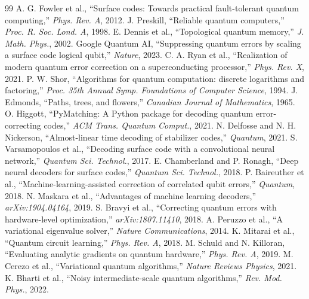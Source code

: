 \documentclass[journal,twocolumn]{IEEEtran}
\begin{document}
\begin{thebibliography}{99}
 A. G. Fowler et al., ``Surface codes: Towards practical fault-tolerant quantum computing,'' \textit{Phys. Rev. A}, 2012.
 J. Preskill, ``Reliable quantum computers,'' \textit{Proc. R. Soc. Lond. A}, 1998.
 E. Dennis et al., ``Topological quantum memory,'' \textit{J. Math. Phys.}, 2002.
 Google Quantum AI, ``Suppressing quantum errors by scaling a surface code logical qubit,'' \textit{Nature}, 2023.
 C. A. Ryan et al., ``Realization of modern quantum error correction on a superconducting processor,'' \textit{Phys. Rev. X}, 2021.
 P. W. Shor, ``Algorithms for quantum computation: discrete logarithms and factoring,'' \textit{Proc. 35th Annual Symp. Foundations of Computer Science}, 1994.
 J. Edmonds, ``Paths, trees, and flowers,'' \textit{Canadian Journal of Mathematics}, 1965.
 O. Higgott, ``PyMatching: A Python package for decoding quantum error-correcting codes,'' \textit{ACM Trans. Quantum Comput.}, 2021.
 N. Delfosse and N. H. Nickerson, ``Almost-linear time decoding of stabilizer codes,'' \textit{Quantum}, 2021.
 S. Varsamopoulos et al., ``Decoding surface code with a convolutional neural network,'' \textit{Quantum Sci. Technol.}, 2017.
 E. Chamberland and P. Ronagh, ``Deep neural decoders for surface codes,'' \textit{Quantum Sci. Technol.}, 2018.
 P. Baireuther et al., ``Machine-learning-assisted correction of correlated qubit errors,'' \textit{Quantum}, 2018.
 N. Maskara et al., ``Advantages of machine learning decoders,'' \textit{arXiv:1904.04164}, 2019.
 S. Bravyi et al., ``Correcting quantum errors with hardware-level optimization,'' \textit{arXiv:1807.11410}, 2018.
 A. Peruzzo et al., ``A variational eigenvalue solver,'' \textit{Nature Communications}, 2014.
 K. Mitarai et al., ``Quantum circuit learning,'' \textit{Phys. Rev. A}, 2018.
 M. Schuld and N. Killoran, ``Evaluating analytic gradients on quantum hardware,'' \textit{Phys. Rev. A}, 2019.
 M. Cerezo et al., ``Variational quantum algorithms,'' \textit{Nature Reviews Physics}, 2021.
 K. Bharti et al., ``Noisy intermediate-scale quantum algorithms,'' \textit{Rev. Mod. Phys.}, 2022.

\end{thebibliography}
\end{document}
